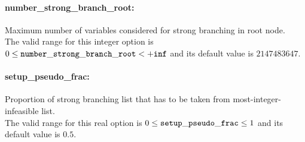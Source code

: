 \paragraph{number\_strong\_branch\_root:} Maximum number of variables considered for strong branching in root node. $\;$ \\
 The valid range for this integer option is
$0 \le {\tt number\_strong\_branch\_root } <  {\tt +inf}$
and its default value is $2147483647$.


\paragraph{setup\_pseudo\_frac:} Proportion of strong branching list that has to be taken from most-integer-infeasible list. $\;$ \\
 The valid range for this real option is 
$0 \le {\tt setup\_pseudo\_frac } \le 1$
and its default value is $0.5$.
